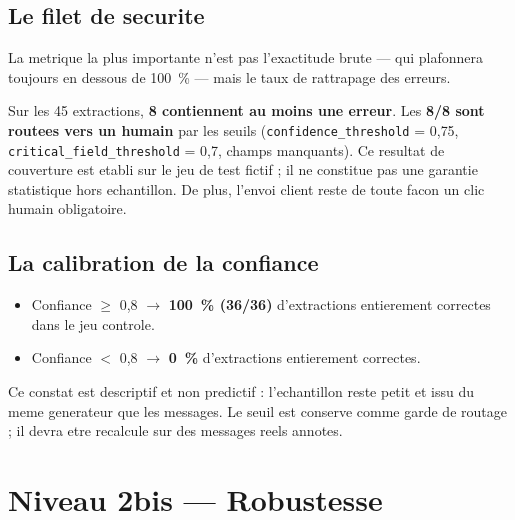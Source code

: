 \documentclass[12pt,a4paper,openany]{report}
\begin{document}
\subsection{Le filet de securite}
La metrique la plus importante n'est pas l'exactitude brute --- qui plafonnera toujours en dessous de 100~\% --- mais le taux de rattrapage des erreurs.

\begin{mechanismbox}
Sur les 45 extractions, \textbf{8 contiennent au moins une erreur}. Les \textbf{8/8 sont routees vers un humain} par les seuils (\texttt{confidence\_threshold} = 0{,}75, \texttt{critical\_field\_threshold} = 0{,}7, champs manquants). Ce resultat de couverture est etabli sur le jeu de test fictif ; il ne constitue pas une garantie statistique hors echantillon. De plus, l'envoi client reste de toute facon un clic humain obligatoire.
\end{mechanismbox}

\subsection{La calibration de la confiance}
\begin{itemize}[leftmargin=1.5cm]
\item Confiance $\geq$ 0{,}8 $\longrightarrow$ \textbf{100~\% (36/36)} d'extractions entierement correctes dans le jeu controle.
\item Confiance $<$ 0{,}8 $\longrightarrow$ \textbf{0~\%} d'extractions entierement correctes.
\end{itemize}
Ce constat est descriptif et non predictif : l'echantillon reste petit et issu du meme generateur que les messages. Le seuil est conserve comme garde de routage ; il devra etre recalcule sur des messages reels annotes.

\section{Niveau 2bis --- Robustesse}
\end{document}

